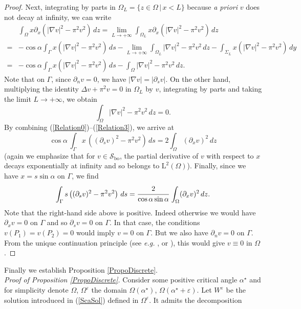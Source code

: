 \documentclass[11pt,a4paper]{article}
\newcommand{\dsp}{\displaystyle}
\newcommand{\eps}{\varepsilon}
\newcommand{\Om}{\Omega}
\newcommand{\mrm}[1]{\mathrm{#1}}
\newcommand{\mL}{\mrm{L}}
\newcommand{\mX}{\mathscr{S}}
\begin{document}
\begin{proof}
Next, integrating by parts in $\Om_L=\{z\in\Om\,|\,x<L\}$ because \textit{a priori} $v$ does not decay at infinity, we can write
\[
\begin{array}{ll}
&\dsp\int_{\Om}x\partial_x(|\nabla v|^2-\pi^2v^2)\,dz  =  \underset{L\to+\infty}{\lim} \dsp\int_{\Om_L}x\partial_x(|\nabla v|^2-\pi^2v^2)\,dz \\[10pt]
 = & -\dsp\cos\alpha\int_{\Gamma}x(|\nabla v|^2-\pi^2v^2)\,ds-\underset{L\to+\infty}{\lim} \dsp\int_{\Om_L}|\nabla v|^2-\pi^2v^2\,dz-\int_{\Sigma_L}x(|\nabla v|^2-\pi^2v^2)\,dy\\[10pt]
  = & -\dsp\cos\alpha\int_{\Gamma}x(|\nabla v|^2-\pi^2v^2)\,ds- \dsp\int_{\Om}|\nabla v|^2-\pi^2v^2\,dz.
\end{array}
\]
Note that on $\Gamma$, since $\partial_nv=0$, we have $|\nabla v|=|\partial_sv|$. On the other hand, multiplying the identity $\Delta v+\pi^2v=0$ in $\Om_L$ by $v$, integrating by parts and taking the limit $L\to+\infty$, we obtain 
\begin{equation}\label{Relation3}
\int_{\Om}|\nabla v|^2-\pi^2v^2\,dz=0.
\end{equation}
By combining (\ref{Relation0})--(\ref{Relation3}),  we arrive at
\[
\cos\alpha\,\int_{\Gamma}x\,((\partial_s v)^2-\pi^2v^2)\,ds=2\dsp\int_{\Om}(\partial_xv)^2\,dz
\]
(again we emphasize that for $v\in\mX_{\mrm{bo}}$, the partial derivative of $v$ with respect to $x$ decays exponentially at infinity and so belongs to $\mL^2(\Om)$). Finally, since we have $x=s\sin\alpha$ on $\Gamma$, we find
\[
\int_{\Gamma}s\left((\partial_sv)^2-\pi^2v^2\right)\,ds=\cfrac{2}{\cos\alpha\sin\alpha}\,\dsp\int_{\Om}(\partial_xv)^2\,dz.
\]
Note that the right-hand side above is positive. Indeed otherwise we would have $\partial_xv=0$ on $\Gamma$ and so $\partial_sv=0$ on $\Gamma$. In that case, the conditions $v(P_1)=v(P_2)=0$ would imply $v=0$ on $\Gamma$. But we also have $\partial_nv=0$ on $\Gamma$. From the unique continuation principle (see \textit{e.g.} \cite{Bers}, \cite[\S8.3]{CoKr98} or \cite{Rond09}), this would give $v\equiv0$ in $\Om$.
\end{proof}
\noindent Finally we establish Proposition \ref{PropoDiscrete}.\\
\newline
\textit{Proof of Proposition \ref{PropoDiscrete}.}
Consider some positive critical angle $\alpha^\star$ and for simplicity denote $\Om$, $\Om^\eps$ the domain $\Om(\alpha^\star)$, $\Om(\alpha^\star+\eps)$. Let $W^\eps$ be the solution introduced in (\ref{ScaSol}) defined in $\Om^\eps$. It admits the decomposition 
\end{document}

